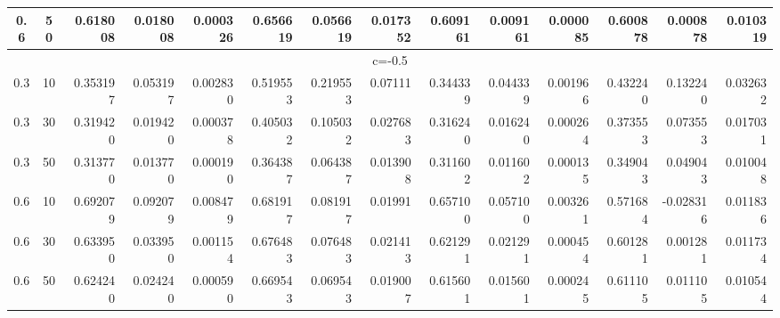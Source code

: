 \documentclass[11pt,a4paper]{article}
\numberwithin{equation}{section}
\begin{document}
\begin{landscape}
\begin{table}[htbp]
\begin{tabular}{cc|rrr|rrr|rrr|rrr}
				0.6   & 50    & 0.618008 & 0.018008 & 0.000326 & 0.656619 & 0.056619 & 0.017352 & 0.609161 & 0.009161 & 0.000085 & 0.600878 & 0.000878 & 0.010319 \\

				\midrule

				\multicolumn{14}{c}{                                      c=-0.5} \\

				\midrule

				0.3   & 10    & 0.353197 & 0.053197 & 0.002830 & 0.519553 & 0.219553 & 0.07111 & 0.344339 & 0.044339 & 0.001966 & 0.432240 & 0.132240 & 0.032632 \\

				0.3   & 30    & 0.319420 & 0.019420 & 0.000378 & 0.405032 & 0.105032 & 0.027683 & 0.316240 & 0.016240 & 0.000264 & 0.373553 & 0.073553 & 0.017031 \\

				0.3   & 50    & 0.313770 & 0.013770 & 0.000190 & 0.364387 & 0.064387 & 0.013908 & 0.311602 & 0.011602 & 0.000135 & 0.349043 & 0.049043 & 0.010048 \\

				0.6   & 10    & 0.692079 & 0.092079 & 0.008479 & 0.681917 & 0.081917 & 0.01991 & 0.657100 & 0.057100 & 0.003261 & 0.571684 & -0.028316 & 0.011836 \\

				0.6   & 30    & 0.633950 & 0.033950 & 0.001154 & 0.676483 & 0.076483 & 0.021413 & 0.621291 & 0.021291 & 0.000454 & 0.601281 & 0.001281 & 0.011734 \\

				0.6   & 50    & 0.624240 & 0.024240 & 0.000590 & 0.669543 & 0.069543 & 0.019007 & 0.615601 & 0.015601 & 0.000245 & 0.611105 & 0.011105 & 0.010544 \\

				\bottomrule

			\end{tabular}%

			\label{os.linex}%

		\end{table}%

		

	\end{landscape}	

	
\end{document}
